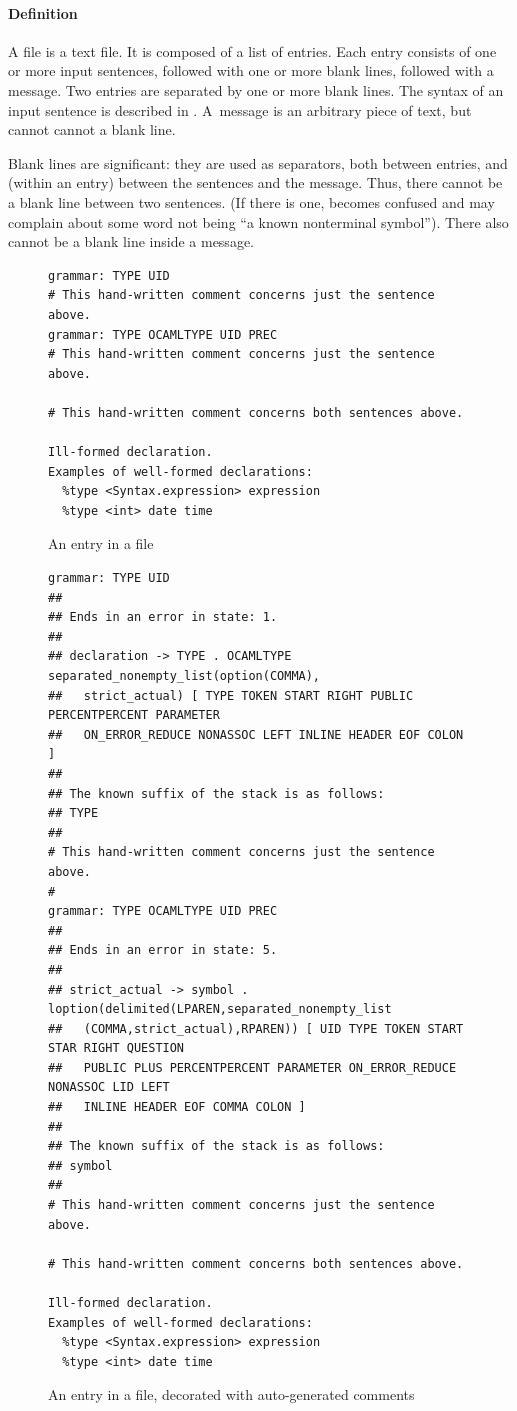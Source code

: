 \documentclass[onecolumn,11pt,nocopyrightspace,preprint]{sigplanconf}
\begin{document}
\paragraph{Definition}

A \messages file is a text file. It is composed of a list of entries. Each
entry consists of one or more input sentences, followed with one or more blank
lines, followed with a message. Two entries are separated by one or more blank
lines. The syntax of an input sentence is described in .
A~message is an arbitrary piece of text, but cannot cannot a blank line.

Blank lines are significant: they are used as separators, both between
entries, and (within an entry) between the sentences and the message. Thus,
there cannot be a blank line between two sentences. (If there is one, \menhir
becomes confused and may complain about some word not being ``a known
nonterminal symbol''). There also cannot be a blank line inside a message.

\begin{figure}
\begin{verbatim}
grammar: TYPE UID
# This hand-written comment concerns just the sentence above.
grammar: TYPE OCAMLTYPE UID PREC
# This hand-written comment concerns just the sentence above.

# This hand-written comment concerns both sentences above.

Ill-formed declaration.
Examples of well-formed declarations:
  %type <Syntax.expression> expression
  %type <int> date time
\end{verbatim}
\caption{An entry in a \messages file}
\label{fig:messages:entry}
\end{figure}

\begin{figure}
\begin{verbatim}
grammar: TYPE UID
##
## Ends in an error in state: 1.
##
## declaration -> TYPE . OCAMLTYPE separated_nonempty_list(option(COMMA),
##   strict_actual) [ TYPE TOKEN START RIGHT PUBLIC PERCENTPERCENT PARAMETER
##   ON_ERROR_REDUCE NONASSOC LEFT INLINE HEADER EOF COLON ]
##
## The known suffix of the stack is as follows:
## TYPE
##
# This hand-written comment concerns just the sentence above.
#
grammar: TYPE OCAMLTYPE UID PREC
##
## Ends in an error in state: 5.
##
## strict_actual -> symbol . loption(delimited(LPAREN,separated_nonempty_list
##   (COMMA,strict_actual),RPAREN)) [ UID TYPE TOKEN START STAR RIGHT QUESTION
##   PUBLIC PLUS PERCENTPERCENT PARAMETER ON_ERROR_REDUCE NONASSOC LID LEFT
##   INLINE HEADER EOF COMMA COLON ]
##
## The known suffix of the stack is as follows:
## symbol
##
# This hand-written comment concerns just the sentence above.

# This hand-written comment concerns both sentences above.

Ill-formed declaration.
Examples of well-formed declarations:
  %type <Syntax.expression> expression
  %type <int> date time
\end{verbatim}
\caption{An entry in a \messages file, decorated with auto-generated comments}
\label{fig:messages:entry:decorated}
\end{figure}
\end{document}
